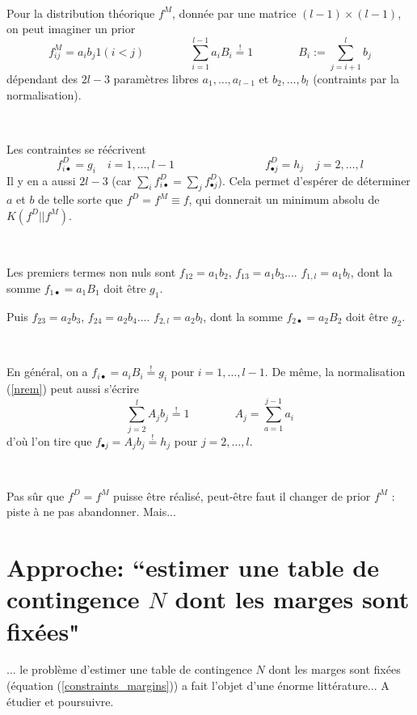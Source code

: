 \documentclass{svmult}
\begin{document}
\

Pour la distribution théorique $f^M$, donnée par une matrice $(l-1)\times (l-1)$, on peut imaginer un prior
\begin{equation}
\label{nrem}
f_{ij}^M=a_ib_j 1(i<j)\qquad\qquad \sum_{i=1}^{l-1} a_i B_i\stackrel{!}{=}1\qquad\qquad B_i:=\sum_{j=i+1}^l b_j
\end{equation}
dépendant des $2l-3$ paramètres libres $a_1,\ldots, a_{l-1}$ et  $b_2,\ldots, b_{l}$ (contraints par la normalisation). 

\

Les contraintes se réécrivent 
\begin{equation}
\label{ }
f_{i\bullet}^D=g_i\quad i=1,\ldots, l-1
\qquad\qquad \qquad\qquad 
f_{\bullet j}^D=h_j\quad j=2,\ldots, l
\end{equation}
Il y en a aussi $2l-3$ (car $\sum_if_{i\bullet}^D=\sum_j f_{\bullet j}^D$). Cela permet d'espérer de déterminer $a$ et $b$ de telle sorte que $f^D=f^M\equiv f$, qui donnerait un minimum absolu de $K(f^D||f^M)$. 

\

Les premiers termes non nuls sont $f_{12}=a_1b_2$, $f_{13}=a_1b_3$.... $f_{1,l}=a_1b_l$, dont la somme $f_{1\bullet}=a_1B_1$ doit être $g_1$. 

Puis $f_{23}=a_2b_3$, $f_{24}=a_2b_4$.... $f_{2,l}=a_2b_l$, dont la somme $f_{2\bullet}=a_2B_2$ doit être $g_2$. 

\

En général, on a $f_{i\bullet}=a_iB_i\stackrel{!}{=}g_i$ pour  $i=1,\ldots, l-1$. De même, la normalisation (\ref{nrem}) peut aussi s'écrire 
\begin{displaymath}
 \sum_{j=2}^{l} A_j b_j\stackrel{!}{=}1\qquad\qquad A_j=\sum_{a=1}^{j-1} a_i
\end{displaymath}
d'où l'on tire que $f_{\bullet j}=A_jb_j\stackrel{!}{=}h_j$ pour  $j=2,\ldots, l$.

\

Pas sûr que $f^D=f^M$ puisse être réalisé, peut-être faut il changer de prior $f^M$ : piste à ne pas abandonner. Mais... 


\section{Approche: ``estimer une table de contingence $N$ dont les marges sont fixées"}
... le problème d'estimer une table de contingence $N$ dont les marges sont fixées  (équation (\ref{constraints_margins})) a fait l'objet d'une énorme littérature... A étudier et poursuivre.
\end{document}
